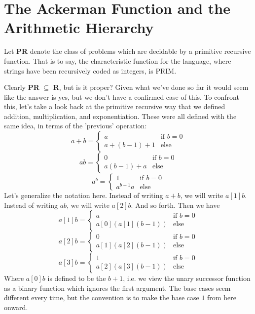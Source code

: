 \section{The Ackerman Function and the Arithmetic Hierarchy}
\begin{definition} 
    Let \textbf{PR} denote the class of problems which are decidable by a primitive recursive function. That is to say, the characteristic function for the language, where strings have been recursively coded as integers, is PRIM.
\end{definition}
Clearly \textbf{PR} $\subseteq$ \textbf{R}, but is it proper? Given what we've done so far it would seem like the answer is yes, but we don't have a confirmed case of this. To confront this, let's take a look back at the primitive recursive way that we defined addition, multiplication, and exponentiation. These were all defined with the same idea, in terms of the 'previous' operation:
\[a+b = \begin{cases}
			a & \textrm{if } b=0 \\ 
			a+(b-1)+1 & \textrm{else }
			\end{cases} \]
\[ab = \begin{cases}
			0 & \textrm{if } b=0 \\
			a(b-1)+a & \textrm{else}
			\end{cases} \]
\[a^b = \begin{cases}
			1 & \textrm{if } b=0 \\
			a^{b-1}a & \textrm{else }
			\end{cases} \]
Let's generalize the notation here. Instead of writing $a+b$, we will write $a[1]b$. Instead of writing $ab$, we will write $a[2]b$. And so forth. Then we have
\[a[1]b = \begin{cases}
			a & \textrm{if } b=0 \\ 
			a[0](a[1](b-1)) & \textrm{else }
			\end{cases} \]
\[a[2]b = \begin{cases}
			0 & \textrm{if } b=0 \\
			a[1](a[2](b-1)) & \textrm{else}
			\end{cases} \]
\[a[3]b = \begin{cases}
			1 & \textrm{if } b=0 \\
			a[2](a[3](b-1)) & \textrm{else }
			\end{cases} \]
Where $a[0]b$ is defined to be the $b+1$, i.e. we view the unary successor function as a binary function which ignores the first argument. The base cases seem different every time, but the convention is to make the base case $1$ from here onward. 
